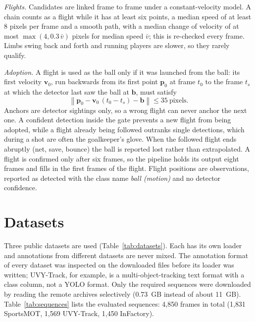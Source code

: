 \documentclass[conference]{IEEEtran}
\begin{document}
\emph{Flights.} Candidates are linked frame to frame under a constant-velocity
model. A chain counts as a flight while it has at least six points, a median
speed of at least 8 pixels per frame and a smooth path, with a median change of
velocity of at most $\max(4, 0.3\,\bar{v})$ pixels for median speed $\bar{v}$;
this is re-checked every frame. Limbs swing back and forth and running players are
slower, so they rarely qualify.

\emph{Adoption.} A flight is used as the ball only if it was launched from the
ball: its first velocity $\mathbf{v}_{0}$, run backwards from its first point
$\mathbf{p}_{0}$ at frame $t_{0}$ to the frame $t_{s}$ at which the detector last
saw the ball at $\mathbf{b}$, must satisfy
\begin{equation}
\left\lVert \mathbf{p}_{0}-\mathbf{v}_{0}\,(t_{0}-t_{s})-\mathbf{b}\right\rVert \le 35~\text{pixels}.
\label{eq:launch}
\end{equation}
Anchors are detector sightings only, so a wrong flight can never anchor the next
one. A confident detection inside the gate prevents a new flight from being
adopted, while a flight already being followed outranks single detections, which
during a shot are often the goalkeeper's glove. When the followed flight ends
abruptly (net, save, bounce) the ball is reported lost rather than extrapolated. A
flight is confirmed only after six frames, so the pipeline holds its output eight
frames and fills in the first frames of the flight. Flight positions are
observations, reported as detected with the class name \emph{ball (motion)} and no
detector confidence.

\section{Datasets}
\label{sec:datasets}
Three public datasets are used (Table~\ref{tab:datasets}). Each has its own
loader and annotations from different datasets are never mixed. The annotation
format of every dataset was inspected on the downloaded files before its loader
was written; UVY-Track, for example, is a multi-object-tracking text format with
a class column, not a YOLO format. Only the required sequences were downloaded by
reading the remote archives selectively (0.73~GB instead of about 11~GB).
Table~\ref{tab:sequences} lists the evaluated sequences: 4{,}850 frames in
total (1{,}831 SportsMOT, 1{,}569 UVY-Track, 1{,}450 InFactory).
\end{document}
